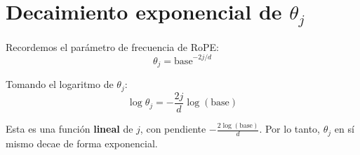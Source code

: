 \section{Decaimiento exponencial de $\theta_j$}

Recordemos el parámetro de frecuencia de RoPE:
$$
\theta_j = \text{base}^{-2j/d}
$$

Tomando el logaritmo de $\theta_j$:
$$
\log \theta_j = -\frac{2j}{d} \log(\text{base})
$$

Esta es una función \textbf{lineal} de $j$, con pendiente $-\frac{2\log(\text{base})}{d}$. Por lo tanto, $\theta_j$ en sí mismo decae de forma exponencial.

